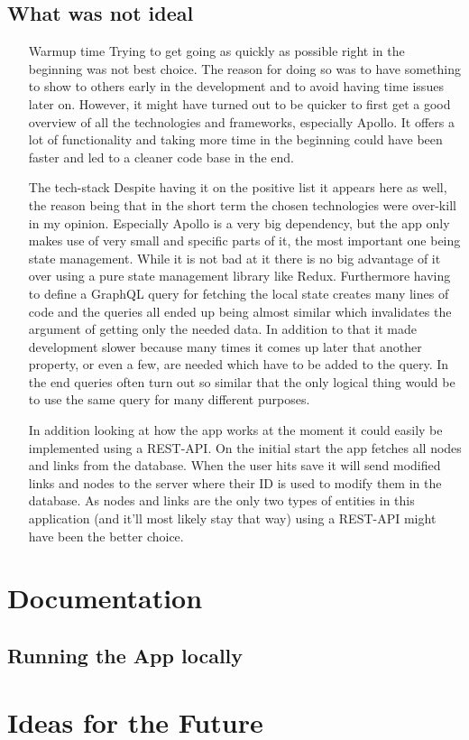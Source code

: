 \section{What was not ideal}
\begin{itemize}
\item[Warmup time] Trying to get going as quickly as possible right in the beginning was not best choice. The reason for doing so was to have something to show to others early in the development and to avoid having time issues later on. However, it might have turned out to be quicker to first get a good overview of all the technologies and frameworks, especially Apollo. It offers a lot of functionality and taking more time in the beginning could have been faster and led to a cleaner code base in the end.

\item[The tech-stack] Despite having it on the positive list it appears here as well, the reason being that in the short term the chosen technologies were over-kill in my opinion. Especially Apollo is a very big dependency, but the app only makes use of very small and specific parts of it, the most important one being state management. While it is not bad at it there is no big advantage of it over using a pure state management library like Redux. Furthermore having to define a GraphQL query for fetching the local state creates many lines of code and the queries all ended up being almost similar which invalidates the argument of getting only the needed data. In addition to that it made development slower because many times it comes up later that another property, or even a few, are needed which have to be added to the query. In the end queries often turn out so similar that the only logical thing would be to use the same query for many different purposes.

In addition looking at how the app works at the moment it could easily be implemented using a REST-API. On the initial start the app fetches all nodes and links from the database. When the user hits save it will send modified links and nodes to the server where their ID is used to modify them in the database. As nodes and links are the only two types of entities in this application (and it'll most likely stay that way) using a REST-API might have been the better choice.
\end{itemize}

\chapter{Documentation}
\label{chap:Doc}
\section{Running the App locally}

\chapter{Ideas for the Future}
